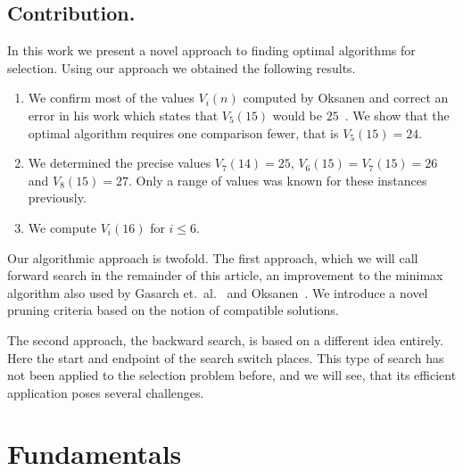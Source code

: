 \documentclass[twoside,leqno,twocolumn]{article}
\begin{document}
\subsection{Contribution.}
In this work we present a novel approach to finding optimal algorithms for selection.
Using our approach we obtained the following results.
\begin{enumerate}
  \item We confirm most of the values $V_i(n)$ computed by Oksanen and correct an error in his work which states that $V_5(15)$ would be $25$~\cite{Oksanen}.
        We show that the optimal algorithm requires one comparison fewer, that is $V_5(15) = 24$.
  \item We determined the precise values $V_7(14) = 25$, $V_6(15) = V_7(15) = 26$ and $V_8(15) = 27$.
        Only a range of values was known for these instances previously.
  \item We compute $V_i(16)$ for $i \le 6$. %
\end{enumerate}

Our algorithmic approach is twofold.
The first approach, which we will call forward search in the remainder of this article, an improvement to the minimax algorithm also used by Gasarch et.\ al\@.~\cite{Gasarch1996} and Oksanen~\cite{Oksanen,Oksanen2006}.
We introduce a novel pruning criteria based on the notion of compatible solutions.

The second approach, the backward search, is based on a different idea entirely.
Here the start and endpoint of the search switch places.
This type of search has not been applied to the selection problem before, and we will see, that its efficient application poses several challenges.

\section{Fundamentals}
\end{document}
